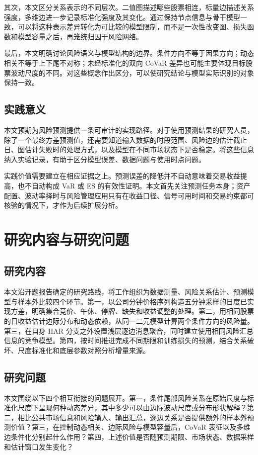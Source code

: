 其次，本文区分关系表示的不同层次。二值图描述哪些股票相连，标量边描述关系强度，多维边进一步记录标准化强度及其变化。通过保持节点信息与骨干模型一致，可以将这种表示差异转化为可比较的模型限制，而不是一次性改变图、损失函数和模型容量之后，再笼统归因于风险网络。

最后，本文明确讨论风险语义与模型结构的边界。条件方向不等于因果方向；动态相关不等于上下尾不对称；未经标准化的双向 CoVaR 差异也可能主要体现目标股票波动尺度的不同。对这些概念作出区分，可以使研究结论与模型实际识别的对象保持一致。

\subsection{实践意义}
本文预期为风险预测提供一条可审计的实现路径。对于使用预测结果的研究人员，除了一个最终方差预测值，还需要知道输入数据的时段范围、风险边的估计截止日、图估计失败时的处理方式，以及模型在不同市场状态下是否稳定。将这些信息纳入实验记录，有助于区分模型误差、数据问题与使用时点问题。

实践价值需要建立在相应证据之上。预测误差的降低并不自动意味着交易收益提高，也不自动构成 VaR 或 ES 的有效性证明。本文首先关注预测任务本身；资产配置、波动率择时与风险管理应用只有在收益口径、信号可用时间和交易约束都可核验的情况下，才作为后续扩展分析。

\section{研究内容与研究问题}
\subsection{研究内容}
本文沿开题报告确定的研究路线\cite{proposal2026}，将工作组织为数据测量、风险关系估计、预测模型与样本外比较四个环节。第一，以公司分钟价格序列构造五分钟采样的日度已实现方差，明确集合竞价、午休、停牌、缺失和收益调整的处理。第二，用相同股票的日收益估计边际分布和动态依赖，从同一二元模型计算两个条件方向的风险量。第三，在自身 HAR 分支之外设置浅层逐边消息聚合，同时建立使用相同风险汇总信息的竞争模型。第四，按时间推进完成不同期限和训练损失的预测，结合关系破坏、尺度标准化和底层参数对照分析增量来源。

\subsection{研究问题}
本文围绕以下四个相互衔接的问题展开。第一，条件尾部风险关系在原始尺度与标准化尺度下呈现何种动态差异，其中多少可以由边际波动尺度或分布形状解释？第二，相比公共市场信息和风险输入、输出汇总，逐边关系是否提供额外的样本外预测价值？第三，在控制动态相关、边际风险与模型容量后，CoVaR 表征以及多维边条件化分别起什么作用？第四，上述价值是否随预测期限、市场状态、数据采样和估计窗口发生变化？

